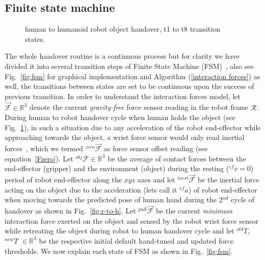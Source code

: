 \subsection{Finite state machine}\label{FSM}

\begin{figure}[hpt]
	\caption{human to humanoid robot object handover, t1 to t8 transition states.}
	\label{fig:h-to-r}
\end{figure}

The whole handover routine is a continuous process but for clarity we have divided it into several transition steps of Finite State Machine (FSM)~\cite{johnson1968automatic}, also see Fig.~\ref{fig:fsm} for graphical implementation and Algorithm (\ref{interaction forces}) as well, the transitions between states are set to be continuous upon the success of previous transition. In order to understand the interaction forces model, let $\mathcal{\vec{F}}\in \mathbb{R}^3$ denote the current \textit{gravity-free} force sensor reading in the robot frame $\mathcal{R}$. During human to robot handover cycle when human holds the object (see Fig.~\ref{fig:h-to-r}), in such a situation due to any acceleration of the robot end-effector while approaching towards the object, a wrist force sensor would only read inertial forces~\cite{spong2008robot}, which we termed ${}^{zero}\vec{\mathcal{F}}$ as force sensor offset reading (see equation~\ref{Fzero}). Let ${}^{obj}\overline{\mathcal{F}}\in \mathbb{R}^3$ be the average of contact forces between the end-effector (gripper) and the environment (object) during the resting (${}^{ef}v=0$) period of robot end-effector along the $xyz$ axes and let ${}^{inert}\vec{\mathcal{F}}$ be the inertial force acting on the object due to the acceleration (lets call it ${}^{ef}a$) of robot end-effector when moving towards the predicted pose of human hand during the 2$^{nd}$ cycle of handover as shown in Fig.~\ref{fig:r-to-h}. Let ${}^{pull}\vec{\mathcal{F}}$ be the current \textit{minimum} interaction force exerted on the object and sensed by the robot wrist force sensor while retreating the object during robot to human handover cycle and let ${}^{old}T$, ${}^{new}T$ $\in \mathbb{R}^3$ be the respective initial default hand-tuned and updated force thresholds. We now explain each state of FSM as shown in Fig.~\ref{fig:fsm}.

